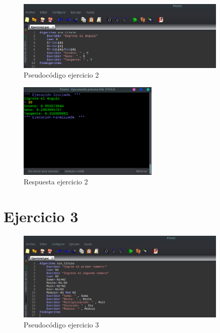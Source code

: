 \documentclass[11pt, a4paper]{report}
\begin{document}
\begin{figure}[!ht]
\begin{center}
  \includegraphics[width=0.9\textwidth]{ejercicio2.png}
  \caption{Pseudoc\'odigo ejercicio 2}
\end{center}
\end{figure}

\begin{figure}[!ht]
\begin{center}
  \includegraphics[width=0.6\textwidth]{respuesta3.png}
  \caption{Respuesta ejercicio 2}
\end{center}
\end{figure}

\newpage
\section*{Ejercicio 3}

\begin{figure}[!ht]
\begin{center}
  \includegraphics[width=0.9\textwidth]{ejercicio3.png}
  \caption{Pseudoc\'odigo ejercicio 3}
\end{center}
\end{figure}
\end{document}
